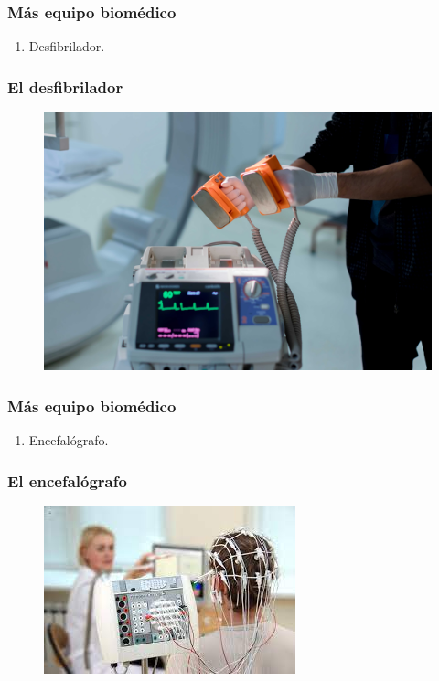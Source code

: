 \documentclass[14pt]{beamer}
\begin{document}
\begin{frame}
\frametitle{Más equipo biomédico}
\begin{enumerate}[<+->]
\conti
\item Desfibrilador.
\seti
\end{enumerate}
\end{frame}
\begin{frame}
\frametitle{El desfibrilador}
\vspace*{-1cm}
\begin{figure}
    \centering
    \includegraphics[scale=0.1]{Imagenes/Instrumentacion_10.jpg}
\end{figure}
\end{frame}
\begin{frame}
\frametitle{Más equipo biomédico}
\begin{enumerate}[<+->]
\conti
\item Encefalógrafo.
\seti
\end{enumerate}
\end{frame}
\begin{frame}
\frametitle{El encefalógrafo}
\vspace*{-1cm}
\begin{figure}
    \centering
    \includegraphics[scale=0.73]{Imagenes/Instrumentacion_11.jpg}
\end{figure}
\end{frame}
\end{document}
